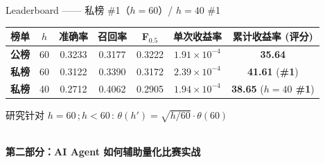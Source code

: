 \documentclass[aspectratio=169,11pt]{beamer}
\newcommand{\rhl}[1]{\textcolor{accred}{\textbf{#1}}}
\begin{document}
\begin{frame}{Leaderboard —— 私榜 \#1（$h{=}60$）/ $h{=}40$ \#1}
  \vspace{-4pt}
  \begin{center}
    \setlength{\tabcolsep}{6pt}\renewcommand{\arraystretch}{1.15}
    \small
    \begin{tabular}{@{}lcccccc@{}}
      \toprule
      榜单 & $h$ & 准确率 & 召回率 & F$_{0.5}$ & 单次收益率 & \textbf{累计收益率 (评分)} \\
      \midrule
      \textbf{公榜} & 60 & 0.3233 & 0.3177 & 0.3222 & $1.91{\times}10^{-4}$ & \rhl{\textbf{35.64}} \\
      \textbf{私榜} & 60 & 0.3122 & 0.3390 & 0.3172 & $2.39{\times}10^{-4}$ & \rhl{\textbf{41.61}}\,\,(\textbf{\#1}) \\
      \textbf{私榜} & 40 & 0.2712 & 0.4062 & 0.2905 & $1.94{\times}10^{-4}$ & \rhl{\textbf{38.65}}\,\,(\textbf{$h{=}40$ \#1}) \\
      \bottomrule
    \end{tabular}
  \end{center}
  \vspace{6pt}
  \begin{center}\footnotesize
    研究针对 $h{=}60$\,;\,$h{<}60$\,: $\theta(h') = \sqrt{h/60} \cdot \theta(60)$
  \end{center}
\end{frame}

\begin{frame}[plain]
  \vfill
  \begin{center}
    \\[24pt]
    {\Huge\bfseries\color{icmlblue} 第二部分：AI Agent 如何辅助量化比赛实战}\\[36pt]
  \end{center}
  \vfill
\end{frame}
\end{document}
